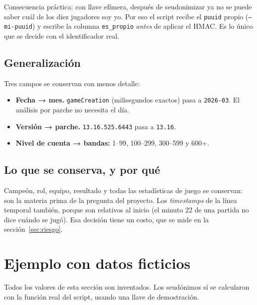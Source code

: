 \documentclass[11pt,letterpaper]{article}
\begin{document}
\noindent Consecuencia práctica: con llave efímera, después de seudonimizar ya no se
puede saber cuál de los diez jugadores soy yo. Por eso el script recibe el
\texttt{puuid} propio (\texttt{--mi-puuid}) y escribe la columna \texttt{es\_propio}
\emph{antes} de aplicar el HMAC. Es lo único que se decide con el identificador real.

\subsection{Generalización}
Tres campos se conservan con menos detalle:
\begin{itemize}[leftmargin=1.4em,itemsep=.25em]
  \item \textbf{Fecha → mes.} \texttt{gameCreation} (milisegundos exactos) pasa a
        \texttt{2026-03}. El análisis por parche no necesita el día.
  \item \textbf{Versión → parche.} \texttt{13.16.525.6443} pasa a \texttt{13.16}.
  \item \textbf{Nivel de cuenta → bandas:} 1--99, 100--299, 300--599 y 600+.
\end{itemize}

\subsection{Lo que se conserva, y por qué}
Campeón, rol, equipo, resultado y todas las estadísticas de juego se conservan:
son la materia prima de la pregunta del proyecto. Los \emph{timestamps} de la línea
temporal también, porque son relativos al inicio (el minuto 22 de una partida no
dice cuándo se jugó). Esa decisión tiene un costo, que se mide en la
sección~\ref{sec:riesgo}.

\section{Ejemplo con datos ficticios}

Todos los valores de esta sección son inventados. Los seudónimos sí se calcularon
con la función real del script, usando una llave de demostración.
\end{document}
